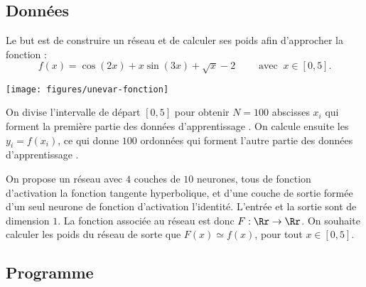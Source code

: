 \documentclass[11pt,class=report,crop=false]{standalone}
\begin{document}
\subsection{Données}

Le but est de construire un réseau et de calculer ses poids afin d'approcher la fonction :
$$f(x) = \cos(2x) + x \sin(3x) + \sqrt{x} - 2 \qquad \text{ avec } \  x \in[0,5].$$
\begin{center}
\texttt{[image: figures/unevar-fonction]}
\end{center}

On divise l'intervalle de départ $[0,5]$ pour obtenir $N=100$ abscisses $x_i$ qui forment la première partie des données d'apprentissage .
On calcule ensuite les $y_i = f(x_i)$, ce qui donne $100$ ordonnées qui forment l'autre partie des données d'apprentissage . 


On propose un réseau avec $4$ couches de $10$ neurones, tous de fonction d'activation la fonction tangente hyperbolique, et d'une couche de sortie formée d'un seul neurone de fonction d'activation l'identité.
L'entrée et la sortie sont de dimension $1$. 
La fonction associée au réseau est donc $F : \Rr \to \Rr$.
On souhaite calculer les poids du réseau de sorte que $F(x) \simeq f(x)$, pour tout $x\in[0,5]$.


\subsection{Programme}
\end{document}
